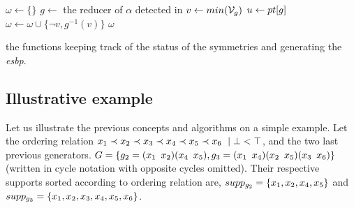  \begin{algorithm}[!htbp]
  
  
  
  
  
  {
   $\omega \gets \{\}$\;
   $g \gets$ the reducer of $\alpha$ detected in \isNotMinimal\;
   $v \gets min(\mathcal{V}_g)$\;
   $u \gets pt[g] $\;
   $\omega \gets \omega \cup \{\neg v, g^{-1}(v)\}$\;
   \Return $\omega$
  }
  \caption{the functions keeping track of the status of the symmetries and generating the \emph{esbp}.}
  \label{algo:keep_status}
  
 \end{algorithm}%
 
 
 
 \subsection{Illustrative example}
  Let us illustrate the previous concepts and algorithms on a simple example. Let the ordering relation $x_1 \prec x_2 \prec x_3 \prec x_4
 \prec x_5 \prec x_6\ \mid \bot < \top$, and the two last previous generators.
 $G = \{
  g_2 = (x_1 \enskip x_2)(x_4 \enskip x_5),g_3 = (x_1 \enskip x_4)(x_2 \enskip x_5)(x_3 \enskip x_6)\}$
 (written in cycle notation with opposite cycles omitted). Their
 respective supports sorted according to ordering relation are, $supp_{g_{2}} = \{x_1, x_2, x_4, x_5\}$ and
 $supp_{g_3} = \{x_1, x_2, x_3, x_4, x_5, x_6\}$.
 
